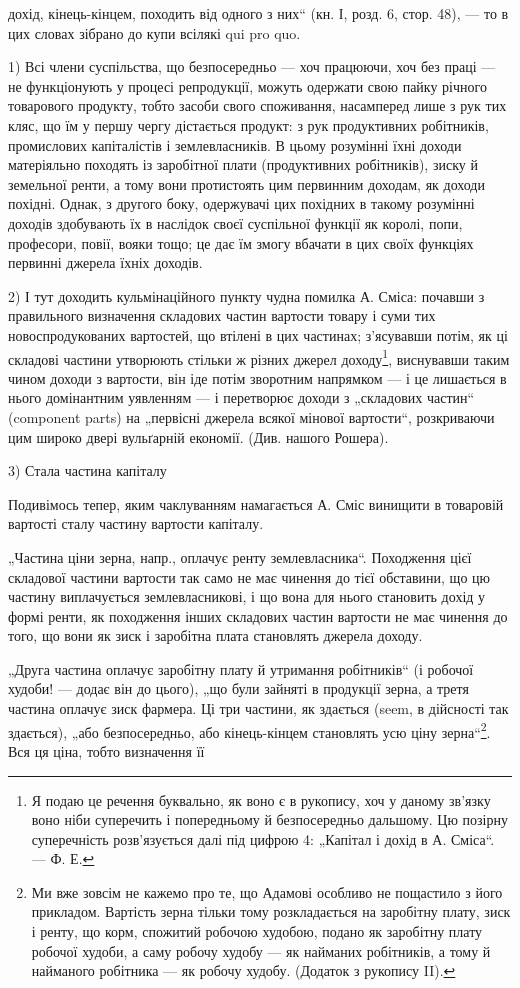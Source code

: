 дохід, кінець-кінцем, походить від одного з них“ (кн. І, розд. 6,
стор. 48), — то в цих словах зібрано до купи всілякі qui pro quo.

1) Всі члени суспільства, що безпосередньо — хоч працюючи, хоч
без праці — не функціонують у процесі репродукції, можуть одержати
свою пайку річного товарового продукту, тобто засоби свого споживання,
насамперед лише з рук тих кляс, що їм у першу чергу дістається
продукт: з рук продуктивних робітників, промислових капіталістів і
землевласників. В цьому розумінні їхні доходи матеріяльно походять із
заробітної плати (продуктивних робітників), зиску й земельної ренти, а
тому вони протистоять цим первинним доходам, як доходи похідні.
Однак, з другого боку, одержувачі цих похідних в такому розумінні доходів
здобувають їх в наслідок своєї суспільної функції як королі,
попи, професори, повії, вояки тощо; це дає їм змогу вбачати в цих
своїх функціях первинні джерела їхніх доходів.

2) І тут доходить кульмінаційного пункту чудна помилка А. Сміса:
почавши з правильного визначення складових частин вартости товару і
суми тих новоспродукованих вартостей, що втілені в цих частинах; з’ясувавши
потім, як ці складові частини утворюють стільки ж різних
джерел доходу\footnote{
Я подаю це речення буквально, як воно є в рукопису, хоч у даному зв’язку
воно ніби суперечить і попередньому й безпосередньо дальшому. Цю позірну
суперечність розв’язується далі під цифрою 4: „Капітал і дохід в А. Сміса“. — Ф. Е.
}, виснувавши таким чином доходи з вартости, він іде
потім зворотним напрямком — і це лишається в нього домінантним уявленням
— і перетворює доходи з „складових частин“ (component parts)
на „первісні джерела всякої мінової вартости“, розкриваючи цим
широко двері вульґарній економії. (Див. нашого Рошера).

3) Стала частина капіталу

Подивімось тепер, яким чаклуванням намагається А. Сміс винищити
в товаровій вартості сталу частину вартости капіталу.

„Частина ціни зерна, напр., оплачує ренту землевласника“. Походження
цієї складової частини вартости так само не має чинення до тієї
обставини, що цю частину виплачується землевласникові, і що вона для
нього становить дохід у формі ренти, як походження інших складових
частин вартости не має чинення до того, що вони як зиск і заробітна
плата становлять джерела доходу.

„Друга частина оплачує заробітну плату й утримання робітників“
(і робочої худоби! — додає він до цього), „що були зайняті в продукції
зерна, а третя частина оплачує зиск фармера. Ці три частини, як здається
(seem, в дійсності так здається), „або безпосередньо, або кінець-кінцем
становлять усю ціну зерна“\footnote{
Ми вже зовсім не кажемо про те, що Адамові особливо не пощастило з
його прикладом. Вартість зерна тільки тому розкладається на заробітну плату,
зиск і ренту, що корм, спожитий робочою худобою, подано як заробітну плату
робочої худоби, а саму робочу худобу — як найманих робітників, а тому й найманого
робітника — як робочу худобу. (Додаток з рукопису II).
}. Вся ця ціна, тобто визначення її